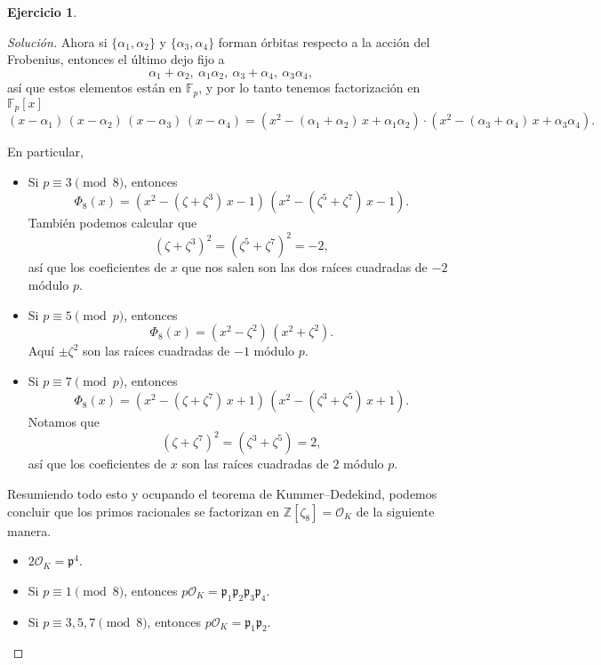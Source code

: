 \documentclass{article}
\newcounter{tarea}
\theoremstyle{definition}
\newtheorem{ejercicio}{Ejercicio}[tarea]
\newenvironment{solucion}{\begin{proof}[Solución]}{\end{proof}}
\newcommand{\ZZ}{\mathbb{Z}}
\newcommand{\FF}{\mathbb{F}}
\renewcommand{\O}{\mathcal{O}}
\begin{document}
\begin{ejercicio}
\begin{solucion}
    Ahora si $\{ \alpha_1, \alpha_2 \}$ y $\{ \alpha_3, \alpha_4 \}$ forman
    órbitas respecto a la acción del Frobenius, entonces el último dejo fijo a
    \[ \alpha_1 + \alpha_2, ~ \alpha_1 \alpha_2, ~
       \alpha_3 + \alpha_4, ~ \alpha_3 \alpha_4, \]
    así que estos elementos están en $\FF_p$, y por lo tanto tenemos
    factorización en $\FF_p [x]$
    \[ (x - \alpha_1)\,(x - \alpha_2)\,(x - \alpha_3)\,(x - \alpha_4) =
       (x^2 - (\alpha_1 + \alpha_2)\,x + \alpha_1 \alpha_2)\cdot
       (x^2 - (\alpha_3 + \alpha_4)\,x + \alpha_3 \alpha_4). \]

    En particular,

    \begin{itemize}
    \item Si $p \equiv 3\pmod{8}$, entonces
      \[ \Phi_8 (x) =
         (x^2 - (\zeta + \zeta^3)\,x - 1)\,(x^2 - (\zeta^5 + \zeta^7)\,x - 1). \]
       También podemos calcular que
       $$(\zeta + \zeta^3)^2 = (\zeta^5 + \zeta^7)^2 = -2,$$
       así que los coeficientes de $x$ que nos salen son las dos raíces
       cuadradas de $-2$ módulo $p$.

     \item Si $p \equiv 5 \pmod{p}$, entonces
       $$\Phi_8 (x) = (x^2 - \zeta^2)\,(x^2 + \zeta^2).$$
       Aquí $\pm \zeta^2$ son las raíces cuadradas de $-1$ módulo $p$.

     \item Si $p \equiv 7 \pmod{p}$, entonces
       \[ \Phi_8 (x) =
          (x^2 - (\zeta + \zeta^7)\,x + 1)\,(x^2 - (\zeta^3 + \zeta^5)\,x + 1). \]
       Notamos que
       $$(\zeta + \zeta^7)^2 = (\zeta^3 + \zeta^5) = 2,$$
       así que los coeficientes de $x$ son las raíces cuadradas de $2$ módulo
       $p$.
    \end{itemize}

    Resumiendo todo esto y ocupando el teorema de Kummer--Dedekind, podemos
    concluir que los primos racionales se factorizan en
    $\ZZ [\zeta_8] = \O_K$ de la siguiente manera.

    \begin{itemize}
    \item $2 \O_K = \mathfrak{p}^4$.

    \item Si $p \equiv 1 \pmod{8}$, entonces
      $p \O_K = \mathfrak{p}_1 \mathfrak{p}_2 \mathfrak{p}_3 \mathfrak{p}_4$.

    \item Si $p \equiv 3,5,7 \pmod{8}$, entonces
      $p \O_K = \mathfrak{p}_1 \mathfrak{p}_2$.
    \end{itemize}


\end{solucion}
\end{ejercicio}
\end{document}
